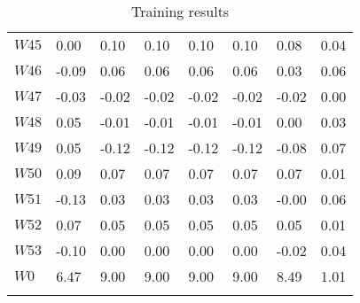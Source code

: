 \documentclass{article}
\begin{document}
\begin{longtable}{llllllll}
    $W45$ &   0.00  & 0.10  & 0.10  & 0.10  & 0.10  & 0.08  & 0.04 \\
    $W46$ &   -0.09 & 0.06  & 0.06  & 0.06  & 0.06  & 0.03  & 0.06 \\
    $W47$ &   -0.03 & -0.02 & -0.02 & -0.02 & -0.02 & -0.02 & 0.00 \\
    $W48$ &   0.05  & -0.01 & -0.01 & -0.01 & -0.01 & 0.00  & 0.03 \\
    $W49$ &   0.05  & -0.12 & -0.12 & -0.12 & -0.12 & -0.08 & 0.07 \\
    $W50$ &   0.09  & 0.07  & 0.07  & 0.07  & 0.07  & 0.07  & 0.01 \\
    $W51$ &   -0.13 & 0.03  & 0.03  & 0.03  & 0.03  & -0.00 & 0.06 \\
    $W52$ &   0.07  & 0.05  & 0.05  & 0.05  & 0.05  & 0.05  & 0.01 \\
    $W53$ &   -0.10 & 0.00  & 0.00  & 0.00  & 0.00  & -0.02 & 0.04 \\
    $W0$ &   6.47  & 9.00  & 9.00  & 9.00  & 9.00  & 8.49  & 1.01   \\
    \bottomrule
    \caption{Training results}
	\label{tab:acc}
\end{longtable}
\end{document}
